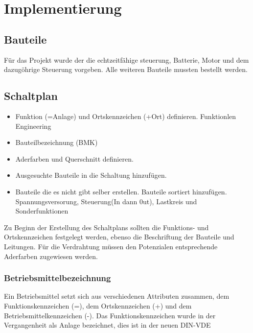 \chapter{Implementierung}

\section{Bauteile}

Für das Projekt wurde der die echtzeitfähige steuerung, Batterie,  Motor und dem dazugöhrige Steuerung vorgeben.  Alle weiteren Bauteile mussten bestellt werden.

\section{Schaltplan}


\begin{itemize}
	\item Funktion (=Anlage) und Ortskennzeichen (+Ort) definieren. Funktionlen Engineering
	\item Bauteilbezeichnung (BMK)
	\item Aderfarben und Querschnitt definieren.
	\item Ausgesuchte Bauteile in die Schaltung hinzufügen.
	\item Bauteile die es nicht gibt selber erstellen.
	      \subitem Bauteile sortiert hinzufügen. Spannungsversorung, Steuerung(In dann 0ut), Lastkreis und Sonderfunktionen


\end{itemize}

Zu Beginn der Erstellung des Schaltplans sollten die Funktions- und Ortskennzeichen festgelegt werden, ebenso die Beschriftung der Bauteile und Leitungen. Für die Verdrahtung müssen den Potenzialen entsprechende Aderfarben zugewiesen werden.

\subsection{Betriebsmittelbezeichnung}
Ein Betriebsmittel setzt sich aus verschiedenen Attributen zusammen, dem Funktionskennzeichen (=), dem Ortskennzeichen (+) und dem Betriebsmittelkennzeichen (-).
Das Funktionskennzeichen wurde in der Vergangenheit als Anlage bezeichnet, dies ist in der neuen DIN-VDE
















